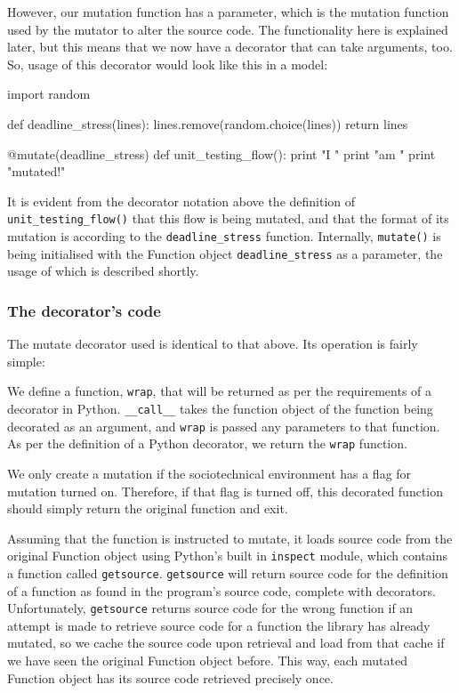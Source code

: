 However, our mutation function has a parameter, which is the mutation function used by the mutator to alter the source code. The functionality here is explained later, but this means that we now have a decorator that can take arguments, too. So, usage of this decorator would look like this in a model: 

\begin{pyglist}[language = python, encoding = utf8, caption = {Usage of the mutate decorator}, listingname=\textbf{Code Sample}, numbers=left]
import random

def deadline_stress(lines):
  lines.remove(random.choice(lines))
  return lines
  
@mutate(deadline_stress)
def unit_testing_flow():
  print "I "
  print "am "
  print "mutated!"
\end{pyglist}\par

It is evident from the decorator notation above the definition of \texttt{unit\_testing\_flow()} that this flow is being mutated, and that the format of its mutation is according to the \texttt{deadline\_stress} function. Internally, \texttt{mutate()} is being initialised with the Function object \texttt{deadline\_stress} as a parameter, the usage of which is described shortly. \par


\subsubsection{The decorator's code}
The mutate decorator used is identical to that above. Its operation is fairly simple: \par

We define a function, \texttt{wrap}, that will be returned as per the requirements of a decorator in Python. \texttt{\_\_call\_\_} takes the function object of the function being decorated as an argument, and \texttt{wrap} is passed any parameters to that function. As per the definition of a Python decorator, we return the \texttt{wrap} function. \par

We only create a mutation if the sociotechnical environment has a flag for mutation turned on. Therefore, if that flag is turned off, this decorated function should simply return the original function and exit. \par

Assuming that the function is instructed to mutate, it loads source code from the original Function object using Python's built in \texttt{inspect} module, which contains a function called \texttt{getsource}. \texttt{getsource} will return source code for the definition of a function as found in the program's source code, complete with decorators. Unfortunately, \texttt{getsource} returns source code for the wrong function if an attempt is made to retrieve source code for a function the library has already mutated, so we cache the source code upon retrieval and load from that cache if we have seen the original Function object before. This way, each mutated Function object has its source code retrieved precisely once. \par

